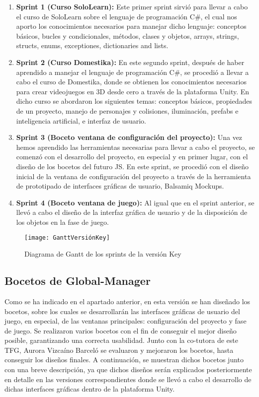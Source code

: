 \begin{enumerate}
	\item \textbf{Sprint 1 (Curso SoloLearn):} Este primer sprint sirvió para llevar a cabo el curso de SoloLearn sobre el lenguaje de programación C\#, el cual nos aporto los conocimientos necesarios para manejar dicho lenguaje: conceptos básicos, bucles y condicionales, métodos, clases y objetos, arrays, strings, structs, enums, exceptiones, dictionaries and lists.
	\item \textbf{Sprint 2 (Curso Domestika):} En este segundo sprint, después de haber aprendido a manejar el lenguaje de programación C\#, se procedió a llevar a cabo el curso de Domestika, donde se obtienen los conocimientos necesarios para crear videojuegos en 3D desde cero a través de la plataforma Unity. En dicho curso se abordaron los siguientes temas: conceptos básicos, propiedades de un proyecto, manejo de personajes y colisiones, iluminación, prefabs e inteligencia artificial, e interfaz de usuario.
	\item \textbf{Sprint 3 (Boceto ventana de configuración del proyecto):} Una vez hemos aprendido las herramientas necesarias para llevar a cabo el proyecto, se comenzó con el desarrollo del proyecto, en especial y en primer lugar, con el diseño de los bocetos del futuro JS. En este sprint, se procedió con el diseño inicial de la ventana de configuración del proyecto a través de la herramienta de prototipado de interfaces gráficas de usuario, Balsamiq Mockups.
	\item \textbf{Sprint 4 (Boceto ventana de juego):} Al igual que en el sprint anterior, se llevó a cabo el diseño de la interfaz gráfica de usuario y de la disposición de los objetos en la fase de juego. 
\end{enumerate}

\begin{figure}[htb]
	\centering
	\texttt{[image: GanttVersiónKey]}
	\caption[Diagrama de Gantt de los sprints de la versión Key]{Diagrama de Gantt de los sprints de la versión Key}
	\label{fig:GanttVersionKey}
\end{figure}

\subsection{Bocetos de Global-Manager}
\label{sec:BocetosGlobal-Manager}

Como se ha indicado en el apartado anterior, en esta versión se han diseñado los bocetos, sobre los cuales se desarrollarán las interfaces gráficas de usuario del juego, en especial, de las ventanas principales: configuración del proyecto y fase de juego. Se realizaron varios bocetos con el fin de conseguir el mejor diseño posible, garantizando una correcta usabilidad. Junto con la co-tutora de este TFG, Aurora Vizcaíno Barceló se evaluaron y mejoraron los bocetos, hasta conseguir los diseños finales. A continuación, se muestran dichos bocetos junto con una breve descripción, ya que dichos diseños serán explicados posteriormente en detalle en las versiones correspondientes donde se llevó a cabo el desarrollo de dichas interfaces gráficas dentro de la plataforma Unity.

